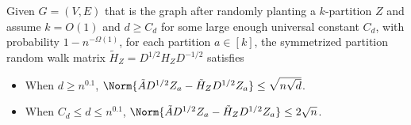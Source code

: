 \begin{lemma}
\label{lem:random_planting_subspace_inclusion}
    Given $G=(V, E)$ that is the graph after randomly planting a $k$-partition $Z$ and assume $k = O(1)$ and $d \geq C_d$ for some large enough universal constant $C_d$, with probability $1-n^{-\Omega(1)}$, for each partition $a \in [k]$, the symmetrized partition random walk matrix $\tilde{H}_Z = D^{1/2} H_Z D^{-1/2}$ satisfies
    \begin{itemize}
        \item When $d \geq n^{0.1}$, $\Norm{\tilde{A} D^{1/2} Z_a - \tilde{H}_Z D^{1/2} Z_a} \leq \sqrt{n \sqrt{d}}$.
        \item When $C_d \leq d \leq n^{0.1}$, $\Norm{\tilde{A} D^{1/2} Z_a - \tilde{H}_Z D^{1/2} Z_a} \leq 2\sqrt{n}$.
    \end{itemize}
\end{lemma}

